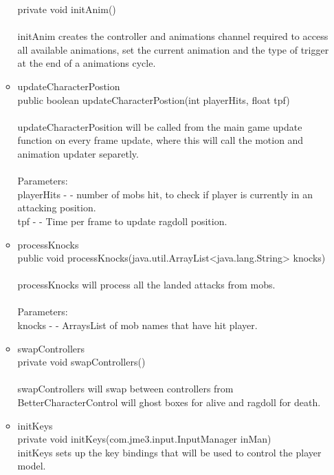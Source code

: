 \documentclass[letterpaper]{article}
\begin{document}
\begin{itemize}
\begin{itemize}
													private void initAnim() \\ \\
													initAnim creates the controller and animations channel required to access all available animations, set the current animation and the type of trigger at the end of a animations cycle.
											\item	updateCharacterPostion \\
													public boolean updateCharacterPostion(int playerHits,
													                             float tpf) \\ \\
													updateCharacterPosition will be called from the main game update function on every frame update, where this will call the motion and animation updater separetly. \\ \\
													Parameters: \\
													playerHits - - number of mobs hit, to check if player is currently in an attacking position. \\
													tpf - - Time per frame to update ragdoll position. \\
											\item	processKnocks \\
													public void processKnocks(java.util.ArrayList<java.lang.String> knocks) \\ \\
													processKnocks will process all the landed attacks from mobs. \\ \\
													Parameters: \\
													knocks - - ArraysList of mob names that have hit player. \\
											\item	swapControllers \\
													private void swapControllers() \\ \\
													swapControllers will swap between controllers from BetterCharacterControl will ghost boxes for alive and ragdoll for death. \\
											\item	initKeys \\
													private void initKeys(com.jme3.input.InputManager inMan) \\
													initKeys sets up the key bindings that will be used to control the player model. \\ \\

\end{itemize}
\end{itemize}
\end{document}
